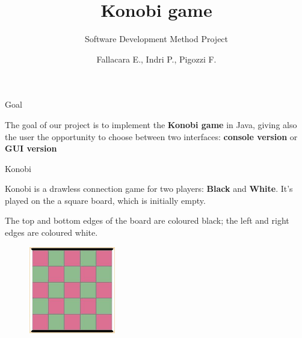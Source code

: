\documentclass{beamer}
\title{Konobi game}
\subtitle{Software Development Method Project}
\author{Fallacara E., Indri P., Pigozzi F.}
\date{}
\begin{document}
	\setcounter{showSlideNumbers}{0}

	\frame{\titlepage}

	\setcounter{framenumber}{0}
	\setcounter{showSlideNumbers}{1}



  \begin{frame}{Goal}

    \begin{center}
      The goal of our project is to implement the \textbf{Konobi game} in Java, giving also the user the opportunity to choose between two interfaces: \textbf{console version} or \textbf{GUI version}
    \end{center}

  \end{frame}



  \begin{frame}{Konobi}

    Konobi is a drawless connection game for two players: \textbf{Black}
    and \textbf{White}. It's played on the a square board, which is initially empty. 

    \vspace{1em}

    The top and bottom edges of the board are coloured black; the left and right edges are coloured white.

    \begin{figure}
      \includegraphics[width=3.8cm, height=3.8cm]{img/board.jpg}
    \end{figure}

  \end{frame}
\end{document}
